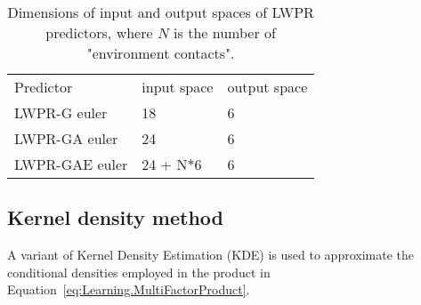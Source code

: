 \begin{table}[b]
\begin{center}
\begin{tabular}{|l|l|l|}
\cline{1-3}
Predictor & input space & output space \\
\cline{1-3}
LWPR-G euler & 18 & 6 \\
LWPR-GA euler & 24 & 6 \\
LWPR-GAE euler & 24 + N*6 & 6 \\
\cline{1-3}
\end{tabular}
\end{center}
\caption[Input/output space LWPR]{Dimensions of input and output spaces
of LWPR predictors, where $N$ is the number of
"environment contacts".}\label{tab:InpOutSpaceLWPR}
\end{table}


\subsection{Kernel density method}\label{sec:Implementation.kde}

A variant of Kernel Density Estimation (KDE) \cite{scott2004multi-dimensional} is used to approximate the conditional densities employed in the product in Equation~\eqref{eq:Learning.MultiFactorProduct}.

